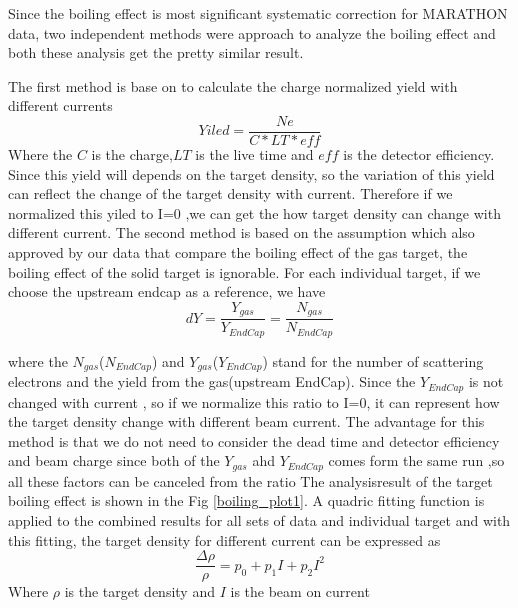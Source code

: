 Since the boiling effect is most significant systematic correction for MARATHON data, two independent methods were approach to analyze the boiling effect and both these analysis get the pretty similar result.

The first method is base on to calculate the charge normalized yield with different currents
\begin{equation}  
Yiled=\dfrac{Ne}{C*LT*eff}
\end{equation} 
Where the $C$ is the charge,$LT$ is the live time and $eff$ is the detector efficiency. Since this yield will depends on the target density, so the variation of this yield can reflect the change of the target density with current. Therefore if we normalized this yiled to I=0 ,we can get the how target density can change with different current.
The second method is based on the assumption which also approved by our data that compare the boiling effect of the gas target, the boiling effect of the solid target is ignorable. For each individual target, if we choose the upstream endcap as a reference, we have 
\begin{equation}  
dY=\dfrac{Y_{gas}}{Y_{EndCap}}=\dfrac{N_{gas}}{N_{EndCap}}
\end{equation}   
 
where the $N_{gas}$($N_{EndCap}$) and $Y_{gas}$($Y_{EndCap}$) stand for the number of scattering electrons and the yield from the gas(upstream EndCap). Since the $Y_{EndCap}$ is not changed with current , so if we normalize this ratio to I=0, it can represent how the target density change with different beam current. The advantage for this method is that we do not need to consider the dead time and detector efficiency and beam charge since both of the $Y_{gas}$ ahd $Y_{EndCap}$ comes form the same run ,so all these factors can be canceled from the ratio
The analysisresult of the target boiling effect is shown in the Fig \ref{boiling_plot1}. A quadric fitting function is applied to the combined results for all sets of data and individual target and with this fitting, the target density for different current can be expressed as 
\begin{equation}  
\dfrac{\Delta \rho}{\rho}=p_{0}+p_{1}I+p_{2}I^{2}
\end{equation}  
Where $\rho$ is the target density and $I$ is the beam on current


